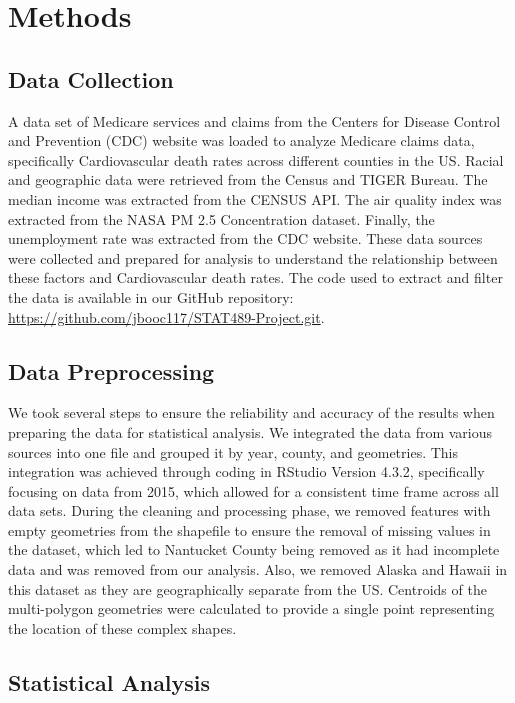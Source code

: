 \documentclass[
]{article}
\begin{document}
\section{Methods}\label{methods}

\subsection{Data Collection}\label{data-collection}

A data set of Medicare services and claims from the Centers for Disease
Control and Prevention (CDC) website was loaded to analyze Medicare
claims data, specifically Cardiovascular death rates across different
counties in the US. Racial and geographic data were retrieved from the
Census and TIGER Bureau. The median income was extracted from the CENSUS
API. The air quality index was extracted from the NASA PM 2.5
Concentration dataset. Finally, the unemployment rate was extracted from
the CDC website. These data sources were collected and prepared for
analysis to understand the relationship between these factors and
Cardiovascular death rates. The code used to extract and filter the data
is available in our GitHub repository:
\url{https://github.com/jbooc117/STAT489-Project.git}.

\subsection{Data Preprocessing}\label{data-preprocessing}

We took several steps to ensure the reliability and accuracy of the
results when preparing the data for statistical analysis. We integrated
the data from various sources into one file and grouped it by year,
county, and geometries. This integration was achieved through coding in
RStudio Version 4.3.2, specifically focusing on data from 2015, which
allowed for a consistent time frame across all data sets. During the
cleaning and processing phase, we removed features with empty geometries
from the shapefile to ensure the removal of missing values in the
dataset, which led to Nantucket County being removed as it had
incomplete data and was removed from our analysis. Also, we removed
Alaska and Hawaii in this dataset as they are geographically separate
from the US. Centroids of the multi-polygon geometries were calculated
to provide a single point representing the location of these complex
shapes.~

\subsection{Statistical Analysis}\label{statistical-analysis}
\end{document}
